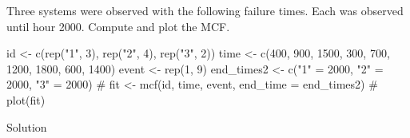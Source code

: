 \documentclass[
  letterpaper,
  DIV=11,
  numbers=noendperiod]{scrreprt}
\newenvironment{Shaded}{\begin{snugshade}}{\end{snugshade}}
\newcommand{\CommentTok}[1]{\textcolor[rgb]{0.37,0.37,0.37}{#1}}
\newcommand{\DecValTok}[1]{\textcolor[rgb]{0.68,0.00,0.00}{#1}}
\newcommand{\FunctionTok}[1]{\textcolor[rgb]{0.28,0.35,0.67}{#1}}
\newcommand{\NormalTok}[1]{\textcolor[rgb]{0.00,0.23,0.31}{#1}}
\newcommand{\OtherTok}[1]{\textcolor[rgb]{0.00,0.23,0.31}{#1}}
\newcommand{\StringTok}[1]{\textcolor[rgb]{0.13,0.47,0.30}{#1}}
\begin{document}
\begin{tcolorbox}[enhanced jigsaw, arc=.35mm, bottomrule=.15mm, bottomtitle=1mm, breakable, colback=white, colbacktitle=quarto-callout-note-color!10!white, colframe=quarto-callout-note-color-frame, coltitle=black, left=2mm, leftrule=.75mm, opacityback=0, opacitybacktitle=0.6, rightrule=.15mm, title=\textcolor{quarto-callout-note-color}{\faInfo}\hspace{0.5em}{Try It}, titlerule=0mm, toprule=.15mm, toptitle=1mm]

Three systems were observed with the following failure times. Each was
observed until hour 2000. Compute and plot the MCF.

\begin{Shaded}
\begin{Highlighting}[]
\NormalTok{id    }\OtherTok{\textless{}{-}} \FunctionTok{c}\NormalTok{(}\FunctionTok{rep}\NormalTok{(}\StringTok{"1"}\NormalTok{, }\DecValTok{3}\NormalTok{), }\FunctionTok{rep}\NormalTok{(}\StringTok{"2"}\NormalTok{, }\DecValTok{4}\NormalTok{), }\FunctionTok{rep}\NormalTok{(}\StringTok{"3"}\NormalTok{, }\DecValTok{2}\NormalTok{))}
\NormalTok{time  }\OtherTok{\textless{}{-}} \FunctionTok{c}\NormalTok{(}\DecValTok{400}\NormalTok{, }\DecValTok{900}\NormalTok{, }\DecValTok{1500}\NormalTok{,   }\DecValTok{300}\NormalTok{, }\DecValTok{700}\NormalTok{, }\DecValTok{1200}\NormalTok{, }\DecValTok{1800}\NormalTok{,   }\DecValTok{600}\NormalTok{, }\DecValTok{1400}\NormalTok{)}
\NormalTok{event }\OtherTok{\textless{}{-}} \FunctionTok{rep}\NormalTok{(}\DecValTok{1}\NormalTok{, }\DecValTok{9}\NormalTok{)}
\NormalTok{end\_times2 }\OtherTok{\textless{}{-}} \FunctionTok{c}\NormalTok{(}\StringTok{"1"} \OtherTok{=} \DecValTok{2000}\NormalTok{, }\StringTok{"2"} \OtherTok{=} \DecValTok{2000}\NormalTok{, }\StringTok{"3"} \OtherTok{=} \DecValTok{2000}\NormalTok{)}
\CommentTok{\# fit \textless{}{-} mcf(id, time, event, end\_time = end\_times2)}
\CommentTok{\# plot(fit)}
\end{Highlighting}
\end{Shaded}

Solution


\end{tcolorbox}
\end{document}
